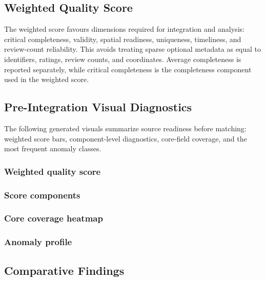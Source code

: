 
\subsection{Weighted Quality Score}

The weighted score favours dimensions required for integration and analysis:
critical completeness, validity, spatial readiness, uniqueness, timeliness, and
review-count reliability. This avoids treating sparse optional metadata as equal
to identifiers, ratings, review counts, and coordinates. Average completeness is
reported separately, while critical completeness is the completeness component
used in the weighted score.


\subsection{Pre-Integration Visual Diagnostics}

The following generated visuals summarize source readiness before matching:
weighted score bars, component-level diagnostics, core-field coverage, and the
most frequent anomaly classes.

\subsubsection*{Weighted quality score}

\subsubsection*{Score components}

\subsubsection*{Core coverage heatmap}

\subsubsection*{Anomaly profile}

\subsection{Comparative Findings}

